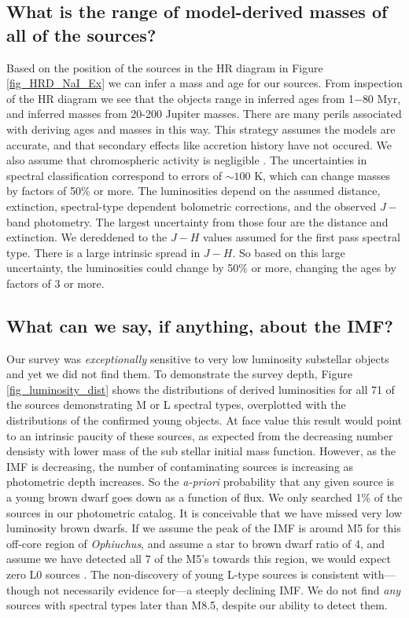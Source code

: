 \subsection{What is the range of model-derived masses of all of the sources?}
Based on the position of the sources in the HR diagram in Figure \ref{fig_HRD_NaI_Ex} we can infer a mass and age for our sources.  From inspection of the HR diagram we see that the objects range in inferred ages from 1$-$80 Myr, and inferred masses from 20-200 Jupiter masses.  There are many perils associated with deriving ages and masses in this way.  This strategy assumes the models are accurate, and that secondary effects like accretion history have not occured.  We also assume that chromospheric activity is negligible \citep{2014ApJ...796..119S}.  The uncertainties in spectral classification correspond to errors of $\sim100$ K, which can change masses by factors of 50\% or more.  The luminosities depend on the assumed distance, extinction, spectral-type dependent bolometric corrections, and the observed $J-$ band photometry.  The largest uncertainty from those four are the distance and extinction.  We dereddened to the $J-H$ values assumed for the first pass spectral type.  There is a large intrinsic spread in $J-H$.  So based on this large uncertainty, the luminosities could change by 50\% or more, changing the ages by factors of 3 or more.  


\subsection{What can we say, if anything, about the IMF?}

Our survey was \emph{exceptionally} sensitive to very low luminosity substellar objects and yet we did not find them.  To demonstrate the survey depth, Figure \ref{fig_luminosity_dist} shows the distributions of derived luminosities for all 71 of the sources demonstrating M or L spectral types, overplotted with the distributions of the confirmed young objects.  At face value this result would point to an intrinsic paucity of these sources, as expected from the decreasing number densisty with lower mass of the sub stellar initial mass function.  However, as the IMF is decreasing, the number of contaminating sources is increasing as photometric depth increases.  So the \emph{a-priori} probability that any given source is a young brown dwarf goes down as a function of flux.  We only searched 1\% of the sources in our photometric catalog.  It is conceivable that we have missed very low luminosity brown dwarfs.  If we assume the peak of the IMF is around M5 for this off-core region of \emph{Ophiuchus}, and assume a star to brown dwarf ratio of 4, and assume we have detected all 7 of the M5's towards this region, we would expect zero L0 sources \citep{2012ARA&A..50...65L}.  The non-discovery of young L-type sources is consistent with---though not necessarily evidence for---a steeply declining IMF.  We do not find \emph{any} sources with spectral types later than M8.5, despite our ability to detect them.

